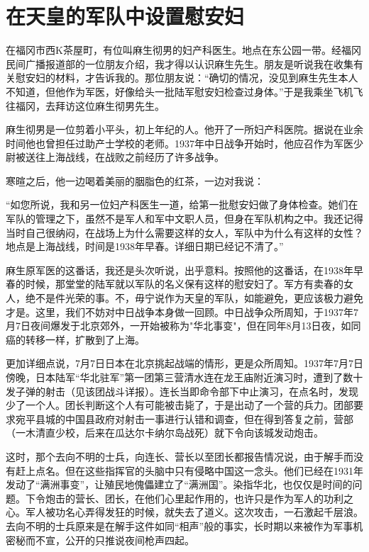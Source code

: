 \documentclass[12pt,UTF8]{ctexbook}
\begin{document}
\section{在天皇的军队中设置慰安妇}

在福冈市西K茶屋町，有位叫麻生彻男的妇产科医生。地点在东公园一带。经福冈民间广播报道部的一位朋友介绍，我才得以认识麻生先生。朋友是听说我在收集有关慰安妇的材料，才告诉我的。那位朋友说：“确切的情况，没见到麻生先生本人不知道，但他作为军医，好像给头一批陆军慰安妇检查过身体。”于是我乘坐飞机飞往福冈，去拜访这位麻生彻男先生。

麻生彻男是一位剪着小平头，初上年纪的人。他开了一所妇产科医院。据说在业余时间他也曾担任过助产士学校的老师。1937年中日战争开始时，他应召作为军医少尉被送往上海战线，在战败之前经历了许多战争。

寒暄之后，他一边喝着美丽的胭脂色的红茶，一边对我说：

“如您所说，我和另一位妇产科医生一道，给第一批慰安妇做了身体检查。她们在军队的管理之下，虽然不是军人和军中文职人员，但身在军队机构之中。我还记得当时自己很纳闷，在战场上为什么需要这样的女人，军队中为什么有这样的女性？地点是上海战线，时间是1938年早春。详细日期已经记不清了。”

麻生原军医的这番话，我还是头次听说，出乎意料。按照他的这番话，在1938年早春的时候，那堂堂的陆军就以军队的名义保有这样的慰安妇了。军方有卖春的女人，绝不是件光荣的事。不，毋宁说作为天皇的军队，如能避免，更应该极力避免才是。这里，我们不妨对中日战争本身做一回顾。中日战争众所周知，于1937年7月7日夜间爆发于北京郊外，一开始被称为"华北事变"，但在同年8月13日夜，如同癌的转移一样，扩散到了上海。

更加详细点说，7月7日日本在北京挑起战端的情形，更是众所周知。1937年7月7日傍晚，日本陆军“华北驻军”第一团第三营清水连在龙王庙附近演习时，遭到了数十发子弹的射击（见该团战斗详报）。连长当即命令部下中止演习，在点名时，发现少了一个人。团长判断这个人有可能被击毙了，于是出动了一个营的兵力。团部要求宛平县城的中国县政府对射击一事进行认错和调查，但在得到答复之前，营部（一木清直少校，后来在瓜达尔卡纳尔岛战死）就下令向该城发动炮击。

这时，那个去向不明的士兵，向连长、营长以至团长都报告情况说，由于解手而没有赶上点名。但在这些指挥官的头脑中只有侵略中国这一念头。他们已经在1931年发动了“满洲事变”，让殖民地傀儡建立了“满洲国”。染指华北，也仅仅是时间的问题。下令炮击的营长、团长，在他们心里起作用的，也许只是作为军人的功利之心。军人被功名心弄得发狂的时候，就失去了道义。这次攻击，一石激起千层浪。去向不明的士兵原来是在解手这件如同“相声”般的事实，长时期以来被作为军事机密秘而不宣，公开的只推说夜间枪声四起。
\end{document}
